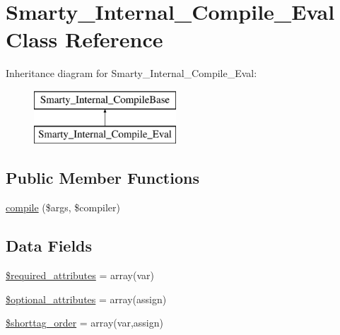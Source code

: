\hypertarget{class_smarty___internal___compile___eval}{}\section{Smarty\+\_\+\+Internal\+\_\+\+Compile\+\_\+\+Eval Class Reference}
\label{class_smarty___internal___compile___eval}
Inheritance diagram for Smarty\+\_\+\+Internal\+\_\+\+Compile\+\_\+\+Eval\+:\begin{figure}[H]
\begin{center}
\leavevmode
\includegraphics[height=2.000000cm]{class_smarty___internal___compile___eval}
\end{center}
\end{figure}
\subsection*{Public Member Functions}
\begin{DoxyCompactItemize}
\item 
\hyperlink{class_smarty___internal___compile___eval_ad72fac0effa74aadee9b5ef6aed5f69f}{compile} (\$args, \$compiler)
\end{DoxyCompactItemize}
\subsection*{Data Fields}
\begin{DoxyCompactItemize}
\item 
\hyperlink{class_smarty___internal___compile___eval_ae799507d5461de485f3a618abeecea95}{\$required\+\_\+attributes} = array(\textquotesingle{}var\textquotesingle{})
\item 
\hyperlink{class_smarty___internal___compile___eval_a899d1eb4a6fecbd6ce696adb171c80a4}{\$optional\+\_\+attributes} = array(\textquotesingle{}assign\textquotesingle{})
\item 
\hyperlink{class_smarty___internal___compile___eval_a2ccb25269c3a92e8c4796c7ef23725e6}{\$shorttag\+\_\+order} = array(\textquotesingle{}var\textquotesingle{},\textquotesingle{}assign\textquotesingle{})
\end{DoxyCompactItemize}


